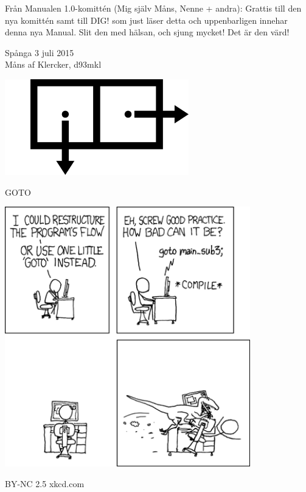 \documentclass[a6paper,fontsize=10pt,twoside,open=right]{scrbook}
\begin{document}
Från Manualen 1.0-komittén (Mig själv Måns,
Nenne + andra): Grattis till den nya komittén samt till DIG! som just
läser detta och uppenbarligen innehar denna nya Manual. Slit den med
hälsan, och sjung mycket! Det är den värd!\par
\vspace{10pt}
\noindent Spånga 3 juli 2015\\
Måns af Klercker, d93mkl\par
\setlength{\parindent}{0pt}
\vfill
\begin{center}
  \noindent\includegraphics[keepaspectratio,width=0.6\textwidth]{elements/consbox.pdf}
\end{center}
\vfill
\null
\newpage

\vspace{15pt}

\newpage

\newpage

\newpage

\newpage

\newpage

\newpage

\newpage

\vfill
{}
\begin{center}
  \tiny{GOTO}\par
  \vspace{5pt}
  \includegraphics[keepaspectratio,width=0.8\textwidth]{elements/images/goto_2.png}\par
  \vspace{5pt}
  \tiny{BY-NC 2.5 xkcd.com}
\end{center}
\end{document}
